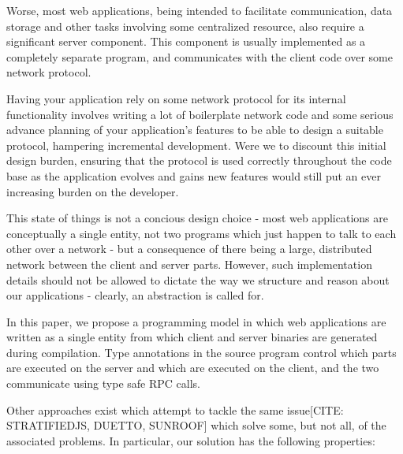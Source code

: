 \documentclass[preprint]{sigplanconf}
\begin{document}
Worse, most web applications, being intended to facilitate communication, data
storage and other tasks involving some centralized resource, also require a
significant server component. This component is usually implemented as a
completely separate program, and communicates with the client code over some
network protocol.

Having your application rely on some network protocol for
its internal functionality involves writing a lot of boilerplate network code
and some serious advance planning of your application's features to be able to
design a suitable protocol, hampering incremental development. Were we to
discount this initial design burden, ensuring that the protocol is used
correctly throughout the code base as the application evolves and gains new
features would still put an ever increasing burden on the developer.

This state of things is not a concious design choice - most web applications
are conceptually a single entity, not two programs which just happen to talk
to each other over a network - but a consequence of there being a large,
distributed network between the client and server parts.
However, such implementation details should not be allowed to dictate the way
we structure and reason about our applications - clearly, an abstraction is
called for.

In this paper, we propose a programming model in which web applications are
written as a single entity from which client and server binaries are generated
during compilation. Type annotations in the source program control which parts
are executed on the server and which are executed on the client, and the two
communicate using type safe RPC calls.

Other approaches exist which attempt to tackle the same issue[CITE: STRATIFIEDJS, DUETTO, SUNROOF]
which solve some, but not all, of the associated problems. In particular, our
solution has the following properties:
\end{document}
